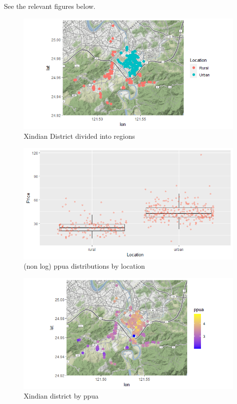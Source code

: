 See the relevant figures below.
\begin{figure}[hbt!]
    \centering
    \includegraphics[scale=0.80]{img/regions.png}
    \caption{Xindian District divided into regions}
    \label{fig:regions}
\end{figure}

\begin{figure}[hbt!]
    \centering
    \includegraphics[scale=0.75]{img/boxplot.png}
    \caption{(non log) ppua distributions by location}
    \label{fig:boxplot}
\end{figure}

\begin{figure}[hbt!]
    \centering
    \includegraphics[scale=0.80]{img/ppuamap.png}
    \caption{Xindian district by ppua}
    \label{fig:ppuamap}
\end{figure}


